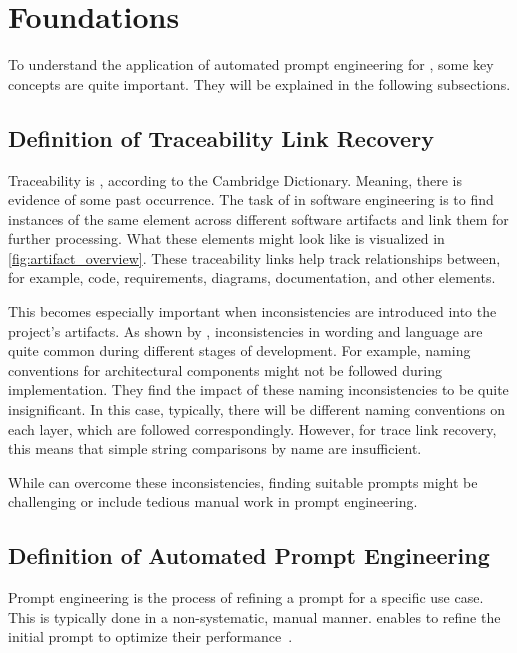\chapter{Foundations}

To understand the application of automated prompt engineering for \TLR, some key concepts are quite important. They will be explained in the following subsections.


\section{Definition of Traceability Link Recovery}
Traceability is , according to the Cambridge Dictionary. Meaning, there is evidence of some past occurrence. 
The task of \TLR in software engineering is to find instances of the same element across different software artifacts and link them for further processing. What these elements might look like is visualized in \autoref{fig:artifact_overview}. These traceability links help track relationships between, for example, code, requirements, diagrams, documentation, and other elements.

This becomes especially important when inconsistencies are introduced into the project's artifacts. As shown by , inconsistencies in wording and language are quite common during different stages of development. For example, naming conventions for architectural components might not be followed during implementation. They find the impact of these naming inconsistencies to be quite insignificant. In this case, typically, there will be different naming conventions on each layer, which are followed correspondingly. However, for trace link recovery, this means that simple string comparisons by name are insufficient.

While \LLMs can overcome these inconsistencies, finding suitable prompts might be challenging or include tedious manual work in prompt engineering. 


\section{Definition of Automated Prompt Engineering}
\label{foundations:sec:automated_prompt_engineering}
Prompt engineering is the process of refining a prompt for a specific use case. This is typically done in a non-systematic, manual manner. \APE enables \LLMs to refine the initial prompt to optimize their performance~\cite{zadenoori2025AutomaticPrompt}.

